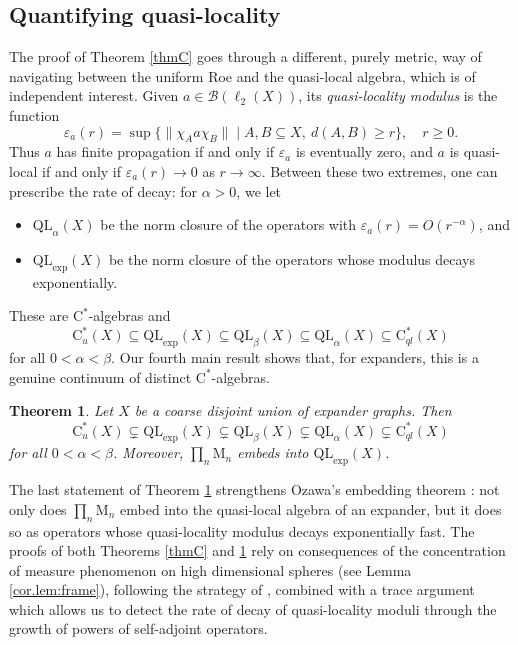 \documentclass[11pt]{amsart}
\numberwithin{equation}{section}
\newtheorem{theoremi}{Theorem}
\theoremstyle{definition}
\theoremstyle{remark}
\begin{document}
\subsection{Quantifying quasi-locality}
The proof of Theorem \ref{thmC} goes through a different, purely metric, way
of navigating  between the uniform Roe and the quasi-local algebra, which is
of independent interest. Given $a\in\mathcal{B}(\ell_2(X))$, its
\emph{quasi-locality  modulus} is the function
\[
\varepsilon_a(r)=\sup\{\|\chi_A a\chi_B\|\mid A,B\subseteq X,\ d(A,B)\ge r\},\quad r\ge 0.
\]
Thus $a$ has finite propagation if and only if $\varepsilon_a$ is eventually
zero, and $a$ is quasi-local if and only if $\varepsilon_a(r)\to 0$ as $r\to\infty$.
Between these two extremes, one can prescribe the rate of decay: for
$\alpha>0$, we let \begin{itemize}\item $\mathrm{QL}_\alpha(X)$ be the norm closure of the operators
with $\varepsilon_a(r)=O(r^{-\alpha})$, and
\item $\mathrm{QL}_{\exp}(X)$ be the norm
closure of the operators whose modulus decays exponentially.
\end{itemize}
These are
$\mathrm{C}^*$-algebras and
\[
\mathrm{C}^*_u(X)\subseteq \mathrm{QL}_{\exp}(X)\subseteq \mathrm{QL}_\beta(X)\subseteq \mathrm{QL}_\alpha(X)\subseteq \mathrm{C}^*_{ql}(X)
\]
for all $0<\alpha<\beta$.  Our fourth main result shows that, for expanders,
this is a genuine continuum of distinct $\mathrm{C}^*$-algebras.

\begin{theoremi}\label{thmD}
Let $X$ be a coarse disjoint union of expander graphs. Then
\[
\mathrm{C}^*_u(X)\subsetneq \mathrm{QL}_{\exp}(X)\subsetneq \mathrm{QL}_\beta(X)\subsetneq \mathrm{QL}_\alpha(X)\subsetneq \mathrm{C}^*_{ql}(X)
\]
for all $0<\alpha<\beta$. Moreover, $\prod_n\mathrm{M}_n$ embeds into
$\mathrm{QL}_{\exp}(X)$.
\end{theoremi}

The last statement of Theorem \ref{thmD} strengthens Ozawa's embedding theorem
\cite[Theorem B]{Ozawa2023}: not only does $\prod_n\mathrm{M}_n$ embed into the
quasi-local algebra of an expander, but it does so as operators whose
quasi-locality modulus decays exponentially fast. The proofs of both
Theorems \ref{thmC} and \ref{thmD} rely on consequences of the concentration of measure
phenomenon on high dimensional spheres (see Lemma \ref{cor.lem:frame}), following the strategy of \cite{Ozawa2023,LiZhangZhu2026},
combined with a trace argument which allows us to detect the rate of decay of
quasi-locality moduli through the growth of powers of self-adjoint operators. 
 
\end{document}
